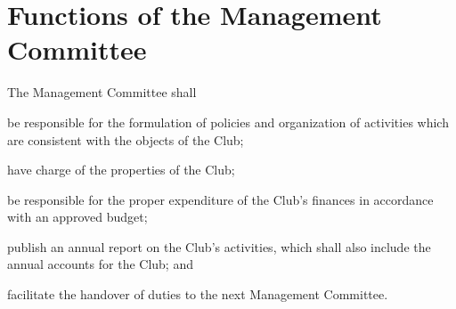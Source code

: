 \section{Functions of the Management Committee}
The Management Committee shall
	\begin{legal}
	\item be responsible for the formulation of policies and organization of activities which are consistent with the objects of the Club;
	\item have charge of the properties of the Club;
	\item be responsible for the proper expenditure of the Club’s finances in accordance with an approved budget;
	\item publish an annual report on the Club’s activities, which shall also include the annual accounts for the Club; and
	\item facilitate the handover of duties to the next Management Committee.
	\end{legal}

